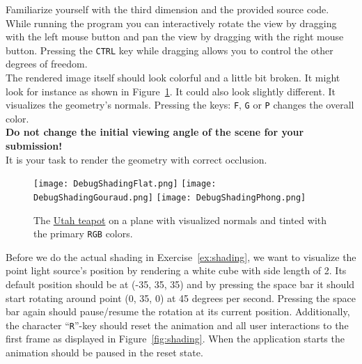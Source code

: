 \documentclass[12pt, a4paper, oneside, ngerman]{article}
\begin{document}




Familiarize yourself with the third dimension and the provided source code.
While running the program you can interactively rotate the view by dragging with the left mouse button and pan the view by dragging with the right mouse button. Pressing the \texttt{CTRL} key while dragging allows you to control the other degrees of freedom.\\
The rendered image itself should look colorful and a little bit broken. It might look for instance as shown in Figure~\ref{fig:debug}. It could also look slightly different. It visualizes the geometry's normals.
Pressing the keys: \texttt{F}, \texttt{G} or \texttt{P} changes the overall color.\\

\textbf{Do not change the initial viewing angle of the scene for your submission!}\\

It is your task to render the geometry with correct occlusion.\\

\begin{figure}
  \centering
  \texttt{[image: DebugShadingFlat.png]}
  \texttt{[image: DebugShadingGouraud.png]}
  \texttt{[image: DebugShadingPhong.png]}
  \caption{The \href{http://en.wikipedia.org/wiki/Utah_teapot}{Utah teapot} on a plane with visualized normals and tinted with the primary \texttt{RGB} colors.}
  \label{fig:debug}
\end{figure}





Before we do the actual shading in Exercise~\ref{ex:shading}, we want to
visualize the point light source's position by rendering a white cube with side length of 2.
Its default position should be at (-35, 35, 35) and by pressing the space bar it should start rotating around point (0, 35, 0) at 45 degrees per second. Pressing the space bar again should pause/resume the rotation at its current position.
Additionally, the character \enquote{\texttt{R}}-key should reset the animation and all user interactions to the first frame as displayed in Figure~\ref{fig:shading}. When the application starts the animation should be paused in the reset state.




\label{ex:shading}
\end{document}

